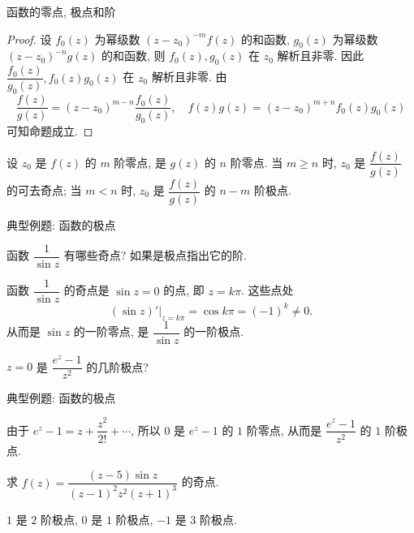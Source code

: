 \begin{frame}{函数的零点, 极点和阶}
\beqskip{7pt}
\begin{proof}
设 $f_0(z)$ 为幂级数 $(z-z_0)^{-m}f(z)$ 的和函数, $g_0(z)$ 为幂级数 $(z-z_0)^{-n}g(z)$ 的和函数,
\onslide<+->
则 $f_0(z),g_0(z)$ 在 $z_0$ 解析且非零.
\onslide<+->
因此 $\dfrac{f_0(z)}{g_0(z)},f_0(z)g_0(z)$ 在 $z_0$ 解析且非零.
\onslide<+->
由
\[\frac{f(z)}{g(z)}=(z-z_0)^{m-n}\frac{f_0(z)}{g_0(z)},\quad
f(z)g(z)=(z-z_0)^{m+n}f_0(z)g_0(z)\]
可知命题成立.
\end{proof}

\begin{corollary}
设 $z_0$ 是 $f(z)$ 的 $m$ 阶零点, 是 $g(z)$ 的 $n$ 阶零点.
\onslide<+->
当 $m\ge n$ 时, $z_0$ 是 $\dfrac{f(z)}{g(z)}$ 的可去奇点; 当 $m<n$ 时, $z_0$ 是 $\dfrac{f(z)}{g(z)}$ 的 $n-m$ 阶极点.
\end{corollary}
\endgroup
\end{frame}


\begin{frame}{典型例题: 函数的极点}
\begin{example}
函数 $\dfrac1{\sin z}$ 有哪些奇点? 如果是极点指出它的阶.
\end{example}
\begin{solution}
函数 $\dfrac1{\sin z}$ 的奇点是 $\sin z=0$ 的点, 即 $z=k\pi$.
\onslide<+->
这些点处
\[(\sin z)'|_{z=k\pi}=\cos{k\pi}=(-1)^k\neq 0.\]
\onslide<+->
从而是 $\sin z$ 的一阶零点, 是 $\dfrac1{\sin z}$ 的一阶极点.
\end{solution}
\begin{example}
$z=0$ 是 $\dfrac{e^z-1}{z^2}$ 的几阶极点?
\end{example}
\end{frame}


\begin{frame}{典型例题: 函数的极点}
\begin{solution}
由于 $e^z-1=z+\dfrac{z^2}{2!}+\cdots$,
\onslide<+->
所以 $0$ 是 $e^z-1$ 的 $1$ 阶零点,
\onslide<+->
从而是 $\dfrac{e^z-1}{z^2}$ 的 $1$ 阶极点.
\end{solution}

\begin{exercise}
求 $f(z)=\dfrac{(z-5)\sin z}{(z-1)^2z^2(z+1)^3}$ 的奇点.
\end{exercise}
\begin{answer}
$1$ 是 $2$ 阶极点, $0$ 是 $1$ 阶极点, $-1$ 是 $3$ 阶极点.
\end{answer}
\end{frame}


